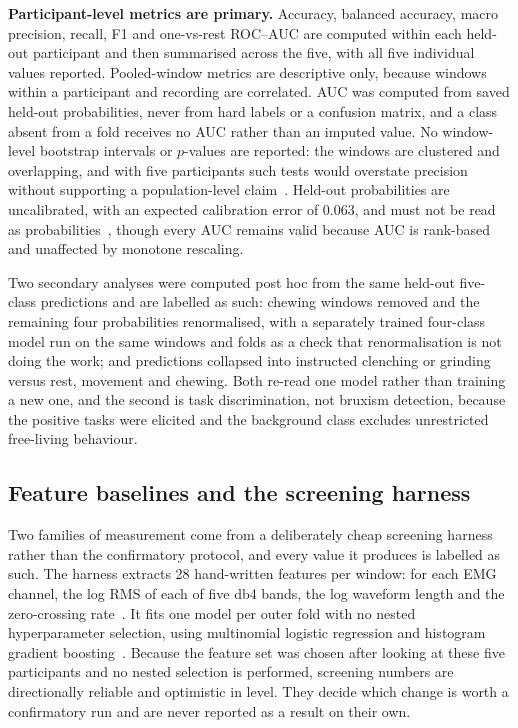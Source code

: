 \documentclass[pdflatex,sn-nature,iicol]{sn-jnl}
\begin{document}
\textbf{Participant-level metrics are primary.} Accuracy, balanced accuracy, macro precision, recall, F1 and one-vs-rest ROC--AUC are computed within each held-out participant and then summarised across the five, with all five individual values reported. Pooled-window metrics are descriptive only, because windows within a participant and recording are correlated. AUC was computed from saved held-out probabilities, never from hard labels or a confusion matrix, and a class absent from a fold receives no AUC rather than an imputed value. No window-level bootstrap intervals or $p$-values are reported: the windows are clustered and overlapping, and with five participants such tests would overstate precision without supporting a population-level claim~\cite{lehmann2006testing,demsar2006statistical}. Held-out probabilities are uncalibrated, with an expected calibration error of 0.063, and must not be read as probabilities~\cite{guo2017calibration}, though every AUC remains valid because AUC is rank-based and unaffected by monotone rescaling.

Two secondary analyses were computed post hoc from the same held-out five-class predictions and are labelled as such: chewing windows removed and the remaining four probabilities renormalised, with a separately trained four-class model run on the same windows and folds as a check that renormalisation is not doing the work; and predictions collapsed into instructed clenching or grinding versus rest, movement and chewing. Both re-read one model rather than training a new one, and the second is task discrimination, not bruxism detection, because the positive tasks were elicited and the background class excludes unrestricted free-living behaviour.

\subsection{Feature baselines and the screening harness}
\label{sec:screening}

Two families of measurement come from a deliberately cheap screening harness rather than the confirmatory protocol, and every value it produces is labelled as such. The harness extracts 28 hand-written features per window: for each EMG channel, the log RMS of each of five db4 bands, the log waveform length and the zero-crossing rate~\cite{phinyomark2012feature}. It fits one model per outer fold with no nested hyperparameter selection, using multinomial logistic regression and histogram gradient boosting~\cite{pedregosa2011scikit}. Because the feature set was chosen after looking at these five participants and no nested selection is performed, screening numbers are directionally reliable and optimistic in level. They decide which change is worth a confirmatory run and are never reported as a result on their own.
\end{document}
